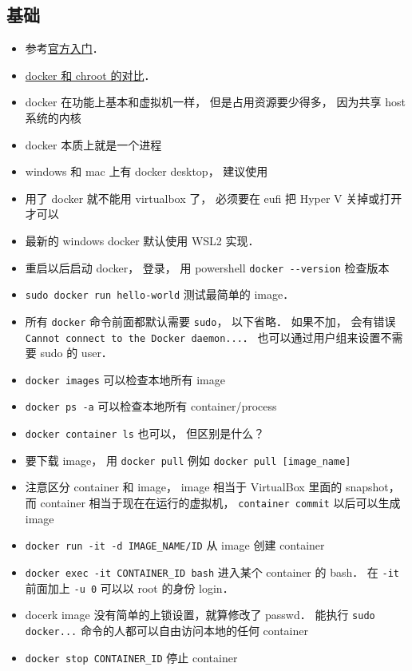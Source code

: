 \subsection{基础}
\begin{itemize}
\item 参考\href{https://docs.docker.com/get-started/}{官方入门}．
\item \href{https://devops.stackexchange.com/questions/2826/difference-between-chroot-and-docker}{docker 和 chroot 的对比}．
\item docker 在功能上基本和虚拟机一样， 但是占用资源要少得多， 因为共享 host 系统的内核
\item docker 本质上就是一个进程
\item windows 和 mac 上有 docker desktop， 建议使用
\item 用了 docker 就不能用 virtualbox 了， 必须要在 eufi 把 Hyper V 关掉或打开才可以
\item 最新的 windows docker 默认使用 WSL2 实现．
\item 重启以后启动 docker， 登录， 用 powershell \verb`docker --version` 检查版本
\item \verb`sudo docker run hello-world` 测试最简单的 image．
\item 所有 \verb|docker| 命令前面都默认需要 \verb|sudo|， 以下省略． 如果不加， 会有错误 \verb|Cannot connect to the Docker daemon...|． 也可以通过用户组来设置不需要 sudo 的 user．
\item \verb`docker images` 可以检查本地所有 image
\item \verb`docker ps -a` 可以检查本地所有 container/process
\item \verb|docker container ls| 也可以， 但区别是什么？
\item 要下载 image， 用 \verb`docker pull` 例如 \verb`docker pull [image_name]`
\item 注意区分 container 和 image， image 相当于 VirtualBox 里面的 snapshot， 而 container 相当于现在在运行的虚拟机， \verb`container commit` 以后可以生成 image
\item \verb`docker run -it -d IMAGE_NAME/ID` 从 image 创建 container
\item \verb`docker exec -it CONTAINER_ID bash` 进入某个 container 的 bash． 在 \verb|-it| 前面加上 \verb|-u 0| 可以以 root 的身份 login．
\item docerk image 没有简单的上锁设置，就算修改了 passwd． 能执行 \verb`sudo docker...` 命令的人都可以自由访问本地的任何 container
\item \verb`docker stop CONTAINER_ID` 停止 container

\end{itemize}
